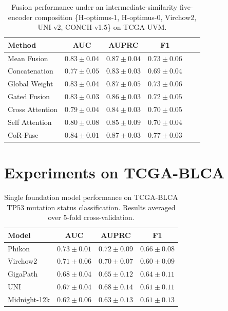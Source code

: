 \begin{table}[htbp]
\centering
\caption{Fusion performance under an intermediate-similarity five-encoder composition \{H-optimus-1, H-optimus-0, Virchow2, UNI-v2, CONCH-v1.5\} on TCGA-UVM.}
\label{tab:uvm_n5_balanced_group}
\begin{tabular}{lccccc}
\toprule
Method & AUC & AUPRC & F1\\
\midrule
Mean Fusion & $0.83 \pm 0.04$ & $0.87 \pm 0.04$ & $0.73 \pm 0.06$\\
Concatenation & $0.77 \pm 0.05$ & $0.83 \pm 0.03$ & $0.69 \pm 0.04$\\
Global Weight & $0.83 \pm 0.04$ & $0.87 \pm 0.05$ & $0.73 \pm 0.06$\\
Gated Fusion & $0.83 \pm 0.03$ & $0.86 \pm 0.03$ & $0.72 \pm 0.05$\\
Cross Attention & $0.79 \pm 0.04$ & $0.84 \pm 0.03$ & $0.70 \pm 0.05$\\
Self Attention & $0.80 \pm 0.08$ & $0.85 \pm 0.09$ & $0.70 \pm 0.04$\\
CoR-Fuse & $\mathbf{0.84 \pm 0.01}$ & $\mathbf{0.87 \pm 0.03}$ & $\mathbf{0.77 \pm 0.03}$\\
\bottomrule
\end{tabular}
\end{table}

\clearpage
\section{Experiments on TCGA-BLCA}
\label{sec:blca_results}

\begin{table}[!ht]
    \centering
    \caption{Single foundation model performance on TCGA-BLCA TP53 mutation status classification. Results averaged over 5-fold cross-validation.}
    \label{tab:blca_all_fm_performance}
    \begin{tabular}{lccc}
    \toprule
    Model & AUC & AUPRC & F1 \\
    \midrule
    Phikon &$\mathbf{0.73 \pm 0.01}$ &$\mathbf{0.72 \pm 0.09}$ &$\mathbf{0.66 \pm 0.08}$ \\
    Virchow2 &$0.71 \pm 0.06$ &$0.70 \pm 0.07$ &$0.60 \pm 0.09$ \\
    GigaPath &$0.68 \pm 0.04$ &$0.65 \pm 0.12$ &$0.64 \pm 0.11$ \\
    UNI &$0.67 \pm 0.04$ &$0.68 \pm 0.14$ &$0.61 \pm 0.11$ \\
    Midnight-12k &$0.62 \pm 0.06$ &$0.63 \pm 0.13$ &$0.61 \pm 0.13$ \\
    \bottomrule
    \end{tabular}
\end{table}


